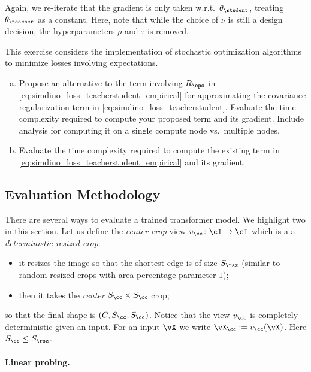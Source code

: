 \documentclass[../../book-main.tex]{subfiles}
\begin{document}
Again, we re-iterate that the gradient is only taken w.r.t.~\(\theta_{\student}\), treating \(\theta_{\teacher}\) as a constant. Here, note that while the choice of \(\nu\) is still a design decision, the hyperparameters \(\rho\) and \(\tau\) is removed.

\begin{exercise}
    This exercise considers the implementation of stochastic optimization algorithms to minimize losses involving expectations.
    \begin{enumerate}[(a)]
        \item Propose an alternative to the term involving \(R_{\eps}\) in \eqref{eq:simdino_loss_teacherstudent_empirical} for approximating the covariance regularization term in \eqref{eq:simdino_loss_teacherstudent}. Evaluate the time complexity required to compute your proposed term and its gradient. Include analysis for computing it on a single compute node vs.~multiple nodes.
        \item  Evaluate the time complexity required to compute the existing term in \eqref{eq:simdino_loss_teacherstudent_empirical} and its gradient.
    \end{enumerate}
\end{exercise}


\subsection{Evaluation Methodology}\label{sub:contrastive_learning_evals}
There are several ways to evaluate a trained transformer model. We highlight two in this section. Let us define the \textit{center crop} view \(v_{\cc} \colon \cI \to \cI\) which is a a \textit{deterministic resized crop}:
\begin{itemize}
    \item it resizes the image so that the shortest edge is of size \(S_{\rsz}\) (similar to random resized crops with area percentage parameter \(1\));
    \item then it takes the \textit{center} \(S_{\cc} \times S_{\cc}\) crop;
\end{itemize}
so that the final shape is \((C, S_{\cc}, S_{\cc})\). Notice that the view \(v_{\cc}\) is completely deterministic given an input. For an input \(\vX\) we write \(\vX_{\cc} := v_{\cc}(\vX)\). Here \(S_{\cc} \leq S_{\rsz}\).


\paragraph{Linear probing.}
\end{document}
